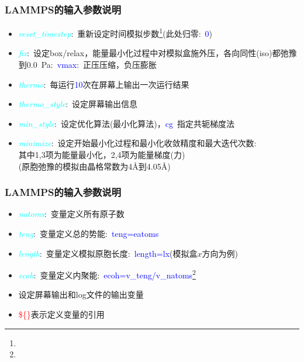 \frame
{
	\frametitle{\textrm{LAMMPS}的输入参数说明}
{\fontsize{7.5pt}{6.0pt}\selectfont{
}
\begin{itemize}
	\item \textcolor{cyan}{\textit{reset\_timestep}}:~重新设定时间模拟步数\footnote{\fontsize{6.2pt}{5.2pt}}(此处归零:~\textcolor{blue}{\textrm{0}})
	\item \textcolor{cyan}{\textit{fix}}:~设定\textrm{box/relax}，能量最小化过程中对模拟盒施外压，各向同性\textrm{(iso)}都弛豫到\textrm{0.0~Pa}:~\textcolor{blue}{\textrm{vmax}}:~正压压缩，负压膨胀
	\item \textcolor{cyan}{\textit{thermo}}:~每运行\textcolor{blue}{10}次在屏幕上输出一次运行结果
	\item \textcolor{cyan}{\textit{thermo\_style}}:~设定屏幕输出信息
	\item \textcolor{cyan}{\textit{min\_style}}:~设定优化算法(最小化算法)，\textcolor{blue}{\textrm{cg}}~指定共轭梯度法
	\item \textcolor{cyan}{\textit{minimize}}:~设定开始最小化过程和最小化收敛精度和最大迭代次数:\\
		其中1,3项为能量最小化，2,4项为能量梯度(力)\\
		(原胞弛豫的模拟由晶格常数为\textrm{4\AA}到\textrm{4.05\AA})
\end{itemize}
}
}

\frame
{
	\frametitle{\textrm{LAMMPS}的输入参数说明}
	{\fontsize{7.5pt}{6.0pt}\selectfont{
}
\begin{itemize}
	\item \textcolor{cyan}{\textit{natoms}}:~变量定义所有原子数
	\item \textcolor{cyan}{\textit{teng}}:~变量定义总的势能:~\textcolor{blue}{\textrm{teng=eatoms}}
	\item \textcolor{cyan}{\textit{length}}:~变量定义模拟原胞长度:~\textcolor{blue}{\textrm{length=lx}}(模拟盒$x$方向为例)
	\item \textcolor{cyan}{\textit{ecoh}}:~变量定义内聚能:~\textcolor{blue}{\textrm{ecoh=v\_teng/v\_natoms}}\footnote{\fontsize{6.2pt}{5.2pt}}
\end{itemize}}
{\fontsize{7.5pt}{6.0pt}\selectfont{
}
\begin{itemize}
	\item 设定屏幕输出和\textrm{log}文件的输出变量
	\item \textcolor{red}{\$\{\}}表示定义变量的引用
\end{itemize}
}
}

